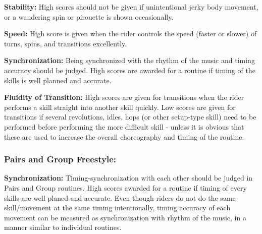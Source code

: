 \textbf{Stability:} High scores should not be given if unintentional jerky body movement, or a wandering spin or pirouette is shown occasionally.

\textbf{Speed:} High score is given when the rider controls the speed (faster or slower) of turns, spins, and transitions excellently.

\textbf{Synchronization:} Being synchronized with the rhythm of the music and timing accuracy should be judged.
High scores are awarded for a routine if timing of the skills is well planned and accurate.

\textbf{Fluidity of Transition:} High scores are given for transitions when the rider performs a skill straight into another skill quickly.
Low scores are given for transitions if several revolutions, idles, hops (or other setup-type skill) need to be performed before performing the more difficult skill - unless it is obvious that these are used to increase the overall choreography and timing of the routine.

\subsubsection{Pairs and Group Freestyle:}
\textbf{Synchronization:} Timing-synchronization with each other should be judged in Pairs and Group routines.
High scores awarded for a routine if timing of every skills are well planed and accurate.
Even though riders do not do the same skill/movement at the same timing intentionally, timing accuracy of each movement can be measured as synchronization with rhythm of the music, in a manner similar to individual routines.

